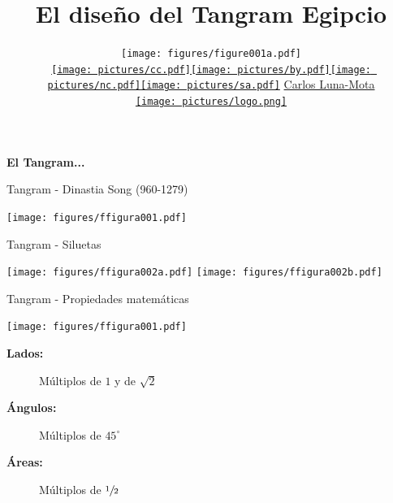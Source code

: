 \documentclass[14pt,aspectratio=169,usenames,dvipsnames]{beamer}
\title{\LARGE{El diseño del Tangram Egipcio}\vspace{-0.5em}}
\author{
    \texttt{[image: figures/figure001a.pdf]}\\[-0.25ex]
    {\small \href{https://creativecommons.org/licenses/by-nc-sa/4.0/}{\texttt{[image: pictures/cc.pdf]}\texttt{[image: pictures/by.pdf]}\texttt{[image: pictures/nc.pdf]}\texttt{[image: pictures/sa.pdf]}} \href{https://github.com/CarlosLunaMota}{Carlos Luna-Mota}}\\
    \vspace{0.55em}
    \href{https://mmaca.cat/}{\texttt{[image: pictures/logo.png]}}
    \vspace{-1.85em}}
\date{}
\begin{document}

    \begin{frame}
        \titlepage
    \end{frame}


    \begin{frame}{}
        \begin{center}
            \textbf{\huge El Tangram...}
        \end{center}
    \end{frame}


    \begin{frame}{Tangram - Dinastia Song (960-1279)}
        \begin{center}
            \texttt{[image: figures/ffigura001.pdf]} \\
        \end{center}
    \end{frame}


    \begin{frame}{Tangram - Siluetas}
        \begin{center}
            \texttt{[image: figures/ffigura002a.pdf]} \quad \texttt{[image: figures/ffigura002b.pdf]} \\
        \end{center}
    \end{frame}


    \begin{frame}{Tangram - Propiedades matemáticas}
        \begin{center}
            \texttt{[image: figures/ffigura001.pdf]} \\

            \bigskip

            \begin{minipage}{0.6\textwidth}
                \begin{description}
                    \item[\textbf{Lados:}]   Múltiplos de $1$ y de $\sqrt{2}$
                    \item[\textbf{Ángulos:}] Múltiplos de $45^\circ$
                    \item[\textbf{Áreas:}]   Múltiplos de $\sfrac{1}{2}$
                \end{description}
            \end{minipage}
        \end{center}
    \end{frame}
\end{document}

